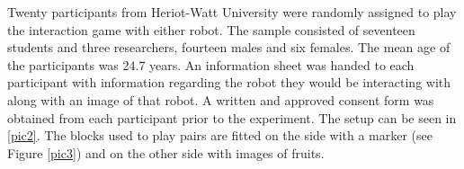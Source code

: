 \documentclass[letterpaper]{article} %
\begin{document}
Twenty participants from Heriot-Watt University were randomly assigned to play the interaction game with either robot. The sample consisted of seventeen students and three researchers, fourteen males and six females. The mean age of the participants was 24.7 years. An information sheet was handed to each participant with information regarding the robot they would be interacting with along with an image of that robot. A written and approved consent form was obtained from each participant prior to the experiment.
The setup can be seen in \ref{pic2}. The blocks used to play pairs are fitted on the side with a marker (see Figure \ref{pic3}) and on the other side with images of fruits.
\end{document}
